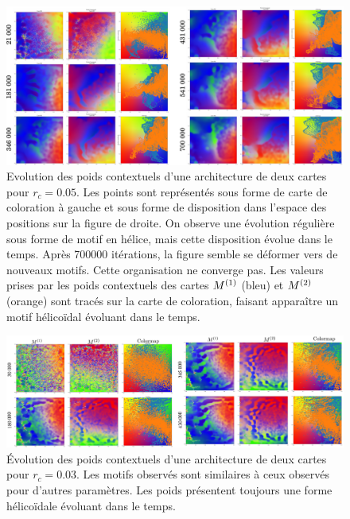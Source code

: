 \documentclass[../main]{subfiles}
\begin{document}
\begin{figure}
	\includegraphics[width=\textwidth]{sphere_rc005_evol_landscape}
	\caption{Evolution des poids contextuels d'une architecture de deux cartes pour $r_c =0.05$. Les points sont représentés sous forme de carte de coloration à gauche et sous forme de disposition dans l'espace des positions sur la figure de droite. On observe une évolution régulière sous forme de motif en hélice, mais cette disposition évolue dans le temps. Après 700000 itérations, la figure semble se déformer vers de nouveaux motifs. Cette organisation ne converge pas. Les valeurs prises par les poids contextuels des cartes $M^{({1})}$ (bleu) et $M^{({2})}$ (orange) sont tracés sur la carte de coloration, faisant apparaître un motif hélicoïdal évoluant dans le temps.
	\label{fig:rc_005}}
\end{figure}


\begin{figure}
	\includegraphics[width=\textwidth]{wc_rc003_evol.pdf}
	\caption{\'Evolution des poids contextuels d'une architecture de deux cartes pour $r_c =0.03$. Les motifs observés sont similaires à ceux observés pour d'autres paramètres. Les poids présentent toujours une forme hélicoïdale évoluant dans le temps.\label{fig:rc_003}}
\end{figure}
\end{document}

